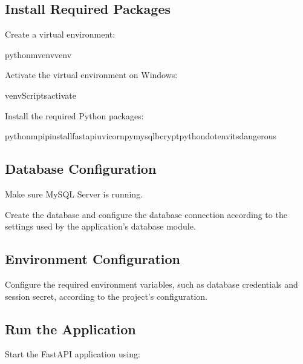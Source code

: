 \documentclass[letterpaper,10pt,english]{sphinxmanual}
\begin{document}
\subsection{Install Required Packages}
\label{\detokenize{installation:install-required-packages}}
\sphinxAtStartPar
Create a virtual environment:

\begin{sphinxVerbatim}[commandchars=\\\{\}]
python\PYGZhy{}mvenvvenv
\end{sphinxVerbatim}

\sphinxAtStartPar
Activate the virtual environment on Windows:

\begin{sphinxVerbatim}[commandchars=\\\{\}]
venv\PYGZbs{}Scripts\PYGZbs{}activate
\end{sphinxVerbatim}

\sphinxAtStartPar
Install the required Python packages:

\begin{sphinxVerbatim}[commandchars=\\\{\}]
python\PYGZhy{}mpipinstallfastapiuvicornpymysqlbcryptpython\PYGZhy{}dotenvitsdangerous
\end{sphinxVerbatim}


\subsection{Database Configuration}
\label{\detokenize{installation:database-configuration}}
\sphinxAtStartPar
Make sure MySQL Server is running.

\sphinxAtStartPar
Create the database and configure the database connection according to the
settings used by the application’s database module.


\subsection{Environment Configuration}
\label{\detokenize{installation:environment-configuration}}
\sphinxAtStartPar
Configure the required environment variables, such as database credentials
and session secret, according to the project’s configuration.


\subsection{Run the Application}
\label{\detokenize{installation:run-the-application}}
\sphinxAtStartPar
Start the FastAPI application using:
\end{document}
